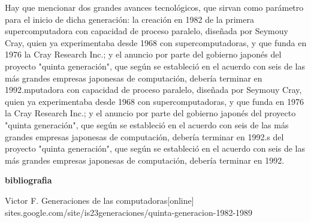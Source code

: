 \documentclass[10pt,a4paper]{article}
\begin{document}
\begin{multicols}{2}
Hay que mencionar dos grandes avances tecnológicos, que sirvan como parámetro para el inicio de dicha generación: la creación en 1982 de la primera supercomputadora con capacidad de proceso paralelo, diseñada por Seymouy Cray, quien ya experimentaba desde 1968 con supercomputadoras, y que funda en 1976 la Cray Research Inc.; y el anuncio por parte del gobierno japonés del proyecto "quinta generación", que según se estableció en el acuerdo con seis de las más grandes empresas japonesas de computación, debería terminar en 1992.mputadora con capacidad de proceso paralelo, diseñada por Seymouy Cray, quien ya experimentaba desde 1968 con supercomputadoras, y que funda en 1976 la Cray Research Inc.; y el anuncio por parte del gobierno japonés del proyecto "quinta generación", que según se estableció en el acuerdo con seis de las más grandes empresas japonesas de computación, debería terminar en 1992.s del proyecto "quinta generación", que según se estableció en el acuerdo con seis de las más grandes empresas japonesas de computación, debería terminar en 1992.
\begin{center}
\textbf{bibliografia}
\end{center}
Victor F. Generaciones de las computadoras[online]
sites.google.com/site/is23generaciones/quinta-generacion-1982-1989 
\end{multicols}
\end{document}

